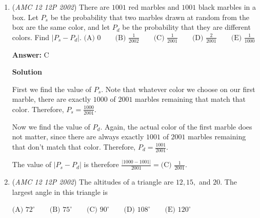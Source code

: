 \begin{enumerate}
 Putting everything together, we have 
 \[i + 2i^2 + ... + 2002i^{2002} = (-2 + 4 - 6 + 8 - ... + 2000 - 2002) + (1 - 3 + 5 - 7 + ... - 1999 + 2001)i\]

 Group every 2 consecutive terms as shown below 
 \[((-2 + 4)+(-6 + 8) + ... + (-1998 + 2000)-2002) + ((1 - 3)+(5 - 7) + ... + (1997 - 1999) + 2001)i\]

 Now we evaluate each small bracket with 2 terms. We get $500(2) = 1000$ in the real part and $500(-2) = -1000$ in the imaginary part. Therefore, the sum becomes $(1000 - 2002) + (-1000 + 2001)i = \boxed {\text{(D) }-1002 + 1001i}$.

 Note: This problem is similar to \href{https://artofproblemsolving.com/wiki/index.php?title=2009\_AMC\_12A\_Problems/Problem\_15}{2009 AMC 12A Problem 15}

 


	\item (\textit{AMC 12 12P 2002}) There are $1001$ red marbles and $1001$ black marbles in a box. Let $P_s$ be the probability that two marbles drawn at random from the box are the same color, and let $P_d$ be the probability that they are different colors. Find $|P_s-P_d|.$
$\text{(A) }0 \qquad \text{(B) }\frac{1}{2002} \qquad \text{(C) }\frac{1}{2001} \qquad \text{(D) }\frac {2}{2001} \qquad \text{(E) }\frac{1}{1000}$

 \textbf{Answer: }C



\textbf{Solution}

First we find the value of $P_s$. Note that whatever color we choose on our first marble, there are exactly $1000$ of $2001$ marbles remaining that match that color. Therefore, $P_s = \frac {1000}{2001}$.

 Now we find the value of $P_d$. Again, the actual color of the first marble does not matter, since there are always exactly $1001$ of $2001$ marbles remaining that don't match that color. Therefore, $P_d = \frac{1001}{2001}$.

 The value of $|P_s - P_d|$ is therefore $\frac {|1000-1001|}{2001} = \boxed {\text{(C) }\frac{1}{2001}}$.

 


	\item (\textit{AMC 12 12P 2002}) The altitudes of a triangle are $12, 15,$ and $20.$ The largest angle in this triangle is


 $\text{(A) }72^\circ \qquad \text{(B) }75^\circ \qquad \text{(C) }90^\circ \qquad \text{(D) }108^\circ \qquad \text{(E) }120^\circ$


\end{enumerate}
